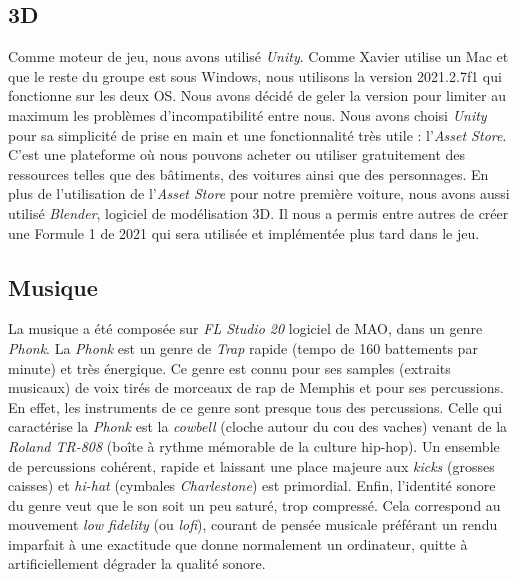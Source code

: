\documentclass[12pt,a4paper]{article}
\begin{document}
    \subsection{3D}
        Comme moteur de jeu, nous avons utilisé \textsl{Unity}. Comme Xavier utilise un Mac 
        et que le reste du groupe est sous Windows, nous utilisons la version 2021.2.7f1 qui
        fonctionne sur les deux OS. Nous avons décidé de geler la version pour limiter au
        maximum les problèmes d'incompatibilité entre nous. Nous avons choisi \textsl{Unity}
        pour sa simplicité de prise en main et une fonctionnalité très utile :
        l'\textsl{Asset Store}. C'est une plateforme où nous pouvons acheter ou
        utiliser gratuitement des ressources telles que des bâtiments, des voitures ainsi que
        des personnages. En plus de l'utilisation de l'\textsl{Asset Store} pour notre première
        voiture, nous avons aussi utilisé \textsl{Blender}, logiciel de modélisation 3D. Il
        nous a permis entre autres de créer une Formule 1 de 2021 qui sera utilisée et
        implémentée plus tard dans le jeu.
    
    \subsection{Musique}
        La musique a été composée sur \textsl{FL Studio 20} logiciel de MAO, dans un genre \textsl{Phonk}.
        La \textsl{Phonk} est un genre de \textit{Trap} rapide (tempo de 160 battements par minute) et très 
        énergique. Ce genre est connu pour ses samples (extraits musicaux) de voix tirés de 
        morceaux de rap de Memphis et pour ses percussions. En effet, les instruments de ce 
        genre sont presque tous des percussions. Celle qui caractérise la \textsl{Phonk} est la
        \textit{cowbell} (cloche autour du cou des vaches) venant de la \textit{Roland TR-808}
        (boîte à rythme mémorable de la culture hip-hop). Un ensemble de percussions cohérent, 
        rapide et laissant une place majeure aux \textit{kicks} (grosses caisses) et \textit{hi-hat}
        (cymbales \textit{Charlestone}) est primordial. Enfin, l'identité sonore du genre
        veut que le son soit un peu saturé, trop compressé. Cela correspond au mouvement
        \textit{low fidelity} (ou \textit{lofi}), courant de pensée musicale préférant un
        rendu imparfait à une exactitude que donne normalement un ordinateur, quitte à
        artificiellement dégrader la qualité sonore.\\
        
\end{document}
